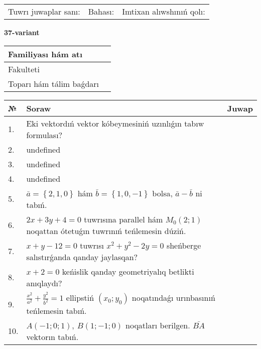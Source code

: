 \documentclass{article}
\begin{document}
\vspace{0.7cm}

\begin{tabular}{lll}
Tuwrı juwaplar sanı: \underline{\hspace{1cm}} & 
Bahası: \underline{\hspace{1cm}} & 
Imtixan alıwshınıń qolı: \underline{\hspace{2cm}} \\
\end{tabular}

\egroup

\newpage


\textbf{37-variant}\\

\bgroup
\def\arraystretch{1.6} %

\begin{tabular}{|m{5.7cm}|m{9.5cm}|}
\hline
Familiyası hám atı & \\
\hline
Fakulteti  & \\
\hline
Toparı hám tálim baǵdarı  & \\
\hline
\end{tabular}

\vspace{0.7cm}

\begin{tabular}{|m{0.7cm}|m{10cm}|m{4cm}|}
\hline
№ & Soraw & Juwap \\
\hline
1. & Eki vektordıń vektor kóbeymesiniń uzınlıǵın tabıw formulası? &  \\
\hline
2. & undefined &  \\
\hline
3. & undefined &  \\
\hline
4. & undefined &  \\
\hline
5. & \(\bar{a} = \left\{ 2, 1, 0 \right\}\) hám \(\bar{b} = \left\{ 1, 0,- 1 \right\}\) bolsa, \(\bar{a} - \bar{b}\) ni tabıń. &  \\
\hline
6. & \(2 x + 3 y + 4 = 0\) tuwrısına parallel hám \(M_{0} (2;1)\) noqattan ótetuǵın tuwrınıń teńlemesin dúziń. &  \\
\hline
7. & \(x + y - 12 = 0\) tuwrısı \(x^{2} + y^{2} - 2 y = 0\) sheńberge salıstırǵanda qanday jaylasqan? &  \\
\hline
8. & \(x + 2 = 0\) keńislik qanday geometriyalıq betlikti anıqlaydı? &  \\
\hline
9. & \(\frac{x^{2}}{a^{2}} + \frac{y^{2}}{b^{2}} = 1\) ellipstiń \((x_{0};y_{0})\) noqatındaǵı urınbasınıń teńlemesin tabıń. &  \\
\hline
10. & \(A (- 1;0;1),\ B (1; - 1;0)\) noqatları berilgen. \(\bar{BA}\) vektorın tabıń. & \\
\hline
\end{tabular}
\end{document}
